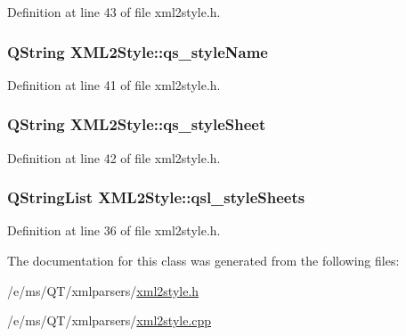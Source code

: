 Definition at line 43 of file xml2style.h.

\hypertarget{classXML2Style_a8dfd6003a5efc5a49e1126edc93c3535}{
\subsubsection[{qs\_\-styleName}]{\setlength{\rightskip}{0pt plus 5cm}QString {\bf XML2Style::qs\_\-styleName}}}
\label{classXML2Style_a8dfd6003a5efc5a49e1126edc93c3535}


Definition at line 41 of file xml2style.h.

\hypertarget{classXML2Style_abb76712e28059172c7d98bd7f6923aed}{
\subsubsection[{qs\_\-styleSheet}]{\setlength{\rightskip}{0pt plus 5cm}QString {\bf XML2Style::qs\_\-styleSheet}}}
\label{classXML2Style_abb76712e28059172c7d98bd7f6923aed}


Definition at line 42 of file xml2style.h.

\hypertarget{classXML2Style_aee8ffe7e9130c6966419b3334e03fad4}{
\subsubsection[{qsl\_\-styleSheets}]{\setlength{\rightskip}{0pt plus 5cm}QStringList {\bf XML2Style::qsl\_\-styleSheets}}}
\label{classXML2Style_aee8ffe7e9130c6966419b3334e03fad4}


Definition at line 36 of file xml2style.h.



The documentation for this class was generated from the following files:\begin{DoxyCompactItemize}
\item 
/e/ms/QT/xmlparsers/\hyperlink{xml2style_8h}{xml2style.h}\item 
/e/ms/QT/xmlparsers/\hyperlink{xml2style_8cpp}{xml2style.cpp}\end{DoxyCompactItemize}
